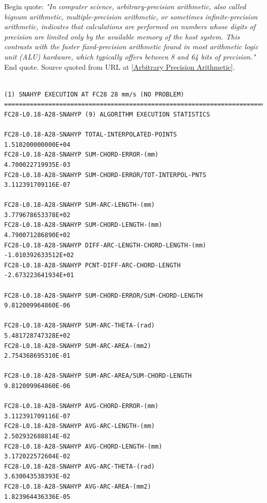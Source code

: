 Begin quote: \textit{"In computer science, arbitrary-precision arithmetic, also called bignum arithmetic, multiple-precision arithmetic, or sometimes infinite-precision arithmetic, indicates that calculations are performed on numbers whose digits of precision are limited only by the available memory of the host system. This contrasts with the faster fixed-precision arithmetic found in most arithmetic logic unit (ALU) hardware, which typically offers between 8 and 64 bits of precision."} End quote. Source quoted from URL at [\href{https://en.wikipedia.org/wiki/Arbitrary-precision_arithmetic}{Arbitrary Precision Arithmetic}]. 


\clearpage
\pagebreak
\begin{landscape}


\begin{lstlisting}[caption={SnaHyp Machine Epsilon Problems}, label=lst-SnaHyp Machine Epsilon Problems]	

(1) SNAHYP EXECUTION AT FC28 28 mm/s (NO PROBLEM)
======================================================================================
FC28-L0.18-A28-SNAHYP (9) ALGORITHM EXECUTION STATISTICS 		

FC28-L0.18-A28-SNAHYP TOTAL-INTERPOLATED-POINTS          	1.510200000000E+04	
FC28-L0.18-A28-SNAHYP SUM-CHORD-ERROR-(mm)               	4.700022719935E-03	
FC28-L0.18-A28-SNAHYP SUM-CHORD-ERROR/TOT-INTERPOL-PNTS  	3.112391709116E-07	

FC28-L0.18-A28-SNAHYP SUM-ARC-LENGTH-(mm)                	3.779678653378E+02	
FC28-L0.18-A28-SNAHYP SUM-CHORD-LENGTH-(mm)              	4.790071286890E+02	
FC28-L0.18-A28-SNAHYP DIFF-ARC-LENGTH-CHORD-LENGTH-(mm)  	-1.010392633512E+02	
FC28-L0.18-A28-SNAHYP PCNT-DIFF-ARC-CHORD-LENGTH         	-2.673223641934E+01	

FC28-L0.18-A28-SNAHYP SUM-CHORD-ERROR/SUM-CHORD-LENGTH   	9.812009964860E-06	

FC28-L0.18-A28-SNAHYP SUM-ARC-THETA-(rad)                	5.481728747328E+02	
FC28-L0.18-A28-SNAHYP SUM-ARC-AREA-(mm2)                 	2.754368695310E-01	

FC28-L0.18-A28-SNAHYP SUM-ARC-AREA/SUM-CHORD-LENGTH      	9.812009964860E-06	

FC28-L0.18-A28-SNAHYP AVG-CHORD-ERROR-(mm)               	3.112391709116E-07	
FC28-L0.18-A28-SNAHYP AVG-ARC-LENGTH-(mm)                	2.502932688814E-02	
FC28-L0.18-A28-SNAHYP AVG-CHORD-LENGTH-(mm)              	3.172022572604E-02	
FC28-L0.18-A28-SNAHYP AVG-ARC-THETA-(rad)                	3.630043538393E-02	
FC28-L0.18-A28-SNAHYP AVG-ARC-AREA-(mm2)                 	1.823964436336E-05	


\end{lstlisting}
\end{landscape}
